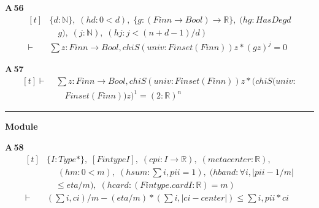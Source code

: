\noindent\textbf{A\,56}\quad{}
{\footnotesize\[ \begin{aligned}[t]
&\{ \mathit{d} : \mathbb{N} \},\; (\mathit{hd} : 0 < \mathit{d}),\; \{ \mathit{g} : (\mathit{Fin} \mathit{n} \to \mathit{Bool}) \to \mathbb{R} \},\; (\mathit{hg} : \mathit{HasDeg} \mathit{d}\\
&\quad \mathit{g}),\; (\mathit{j} : \mathbb{N} ),\; (\mathit{hj} : \mathit{j} < (\mathit{n} + \mathit{d} - 1) / \mathit{d})\\
\vdash\;&\textstyle\sum \mathit{z} : \mathit{Fin} \mathit{n} \to \mathit{Bool}, \mathit{chiS} (\mathit{univ} : \mathit{Finset} (\mathit{Fin} \mathit{n})) \mathit{z} * (\mathit{g} \mathit{z}) ^{\mathit{j}} = 0
\end{aligned} \]}

\noindent\textbf{A\,57}\quad{}
{\footnotesize\[ \begin{aligned}[t]
\vdash\;&\textstyle\sum \mathit{z} : \mathit{Fin} \mathit{n} \to \mathit{Bool}, \mathit{chiS} (\mathit{univ} : \mathit{Finset} (\mathit{Fin} \mathit{n})) \mathit{z} * (\mathit{chiS} (\mathit{univ} :\\
&\quad \mathit{Finset} (\mathit{Fin} \mathit{n})) \mathit{z}) ^{1} = (2 : \mathbb{R} ) ^{\mathit{n}}
\end{aligned} \]}

\vspace{4pt}\noindent\rule{\columnwidth}{0.4pt}\par\vspace{2pt}
\noindent\textbf{Module }\par\vspace{3pt}

\noindent\textbf{A\,58}\quad{}
{\footnotesize\[ \begin{aligned}[t]
&\{ \mathit{I} : \mathit{Type}*\},\; [\mathit{Fintype} \mathit{I}],\; (\mathit{c} \mathit{pi} : \mathit{I} \to \mathbb{R} ),\; (\mathit{m} \mathit{eta} \mathit{center} : \mathbb{R} ),\\
&\quad \; (\mathit{hm} : 0 < \mathit{m}),\; (\mathit{hsum} : \textstyle\sum \mathit{i}, \mathit{pi} \mathit{i} = 1),\; (\mathit{hband} : \forall \mathit{i}, |\mathit{pi} \mathit{i} - 1 / \mathit{m}|\\
&\quad \leq \mathit{eta} / \mathit{m}),\; (\mathit{hcard} : (\mathit{Fintype}.\mathit{card} \mathit{I} : \mathbb{R} ) = \mathit{m})\\
\vdash\;&(\textstyle\sum \mathit{i}, \mathit{c} \mathit{i}) / \mathit{m} - (\mathit{eta} / \mathit{m}) * (\textstyle\sum \mathit{i}, |\mathit{c} \mathit{i} - \mathit{center}|) \leq \textstyle\sum \mathit{i}, \mathit{pi} \mathit{i} * \mathit{c} \mathit{i}
\end{aligned} \]}

